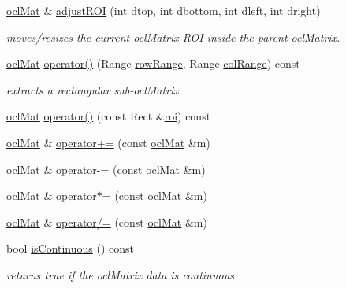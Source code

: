 \begin{DoxyCompactItemize}
\hyperlink{classcv_1_1ocl_1_1oclMat}{ocl\-Mat} \& \hyperlink{classcv_1_1ocl_1_1oclMat_a6303d07326fb07501d21153c2c5d6a2a}{adjust\-R\-O\-I} (int dtop, int dbottom, int dleft, int dright)
\begin{DoxyCompactList}\small\item\em moves/resizes the current ocl\-Matrix R\-O\-I inside the parent ocl\-Matrix. \end{DoxyCompactList}\item 
\hyperlink{classcv_1_1ocl_1_1oclMat}{ocl\-Mat} \hyperlink{classcv_1_1ocl_1_1oclMat_a6d603d156ac2e731adff478dd03a0d9b}{operator()} (Range \hyperlink{classcv_1_1ocl_1_1oclMat_a60bd94d8a6110a2e50bf9fbcfc2db0d2}{row\-Range}, Range \hyperlink{classcv_1_1ocl_1_1oclMat_a8d61c3d2a4c840c9f785ea1e319e1981}{col\-Range}) const 
\begin{DoxyCompactList}\small\item\em extracts a rectangular sub-\/ocl\-Matrix \end{DoxyCompactList}\item 
\hyperlink{classcv_1_1ocl_1_1oclMat}{ocl\-Mat} \hyperlink{classcv_1_1ocl_1_1oclMat_a5419a1174407d3df4804fe95440014e5}{operator()} (const Rect \&\hyperlink{legacy_8hpp_a22e52b2b51d064865d3ac2f27b308c33}{roi}) const 
\item 
\hyperlink{classcv_1_1ocl_1_1oclMat}{ocl\-Mat} \& \hyperlink{classcv_1_1ocl_1_1oclMat_a63fec80cebe9fec8d70b2a97943f9fac}{operator+=} (const \hyperlink{classcv_1_1ocl_1_1oclMat}{ocl\-Mat} \&m)
\item 
\hyperlink{classcv_1_1ocl_1_1oclMat}{ocl\-Mat} \& \hyperlink{classcv_1_1ocl_1_1oclMat_a97b34e86a17e11332cc0b332209e7ee5}{operator-\/=} (const \hyperlink{classcv_1_1ocl_1_1oclMat}{ocl\-Mat} \&m)
\item 
\hyperlink{classcv_1_1ocl_1_1oclMat}{ocl\-Mat} \& \hyperlink{classcv_1_1ocl_1_1oclMat_aefb8803c6926b83ebbb927f3cae698d4}{operator$\ast$=} (const \hyperlink{classcv_1_1ocl_1_1oclMat}{ocl\-Mat} \&m)
\item 
\hyperlink{classcv_1_1ocl_1_1oclMat}{ocl\-Mat} \& \hyperlink{classcv_1_1ocl_1_1oclMat_a55a00c571b0f1528ceb8ca22b81ec57b}{operator/=} (const \hyperlink{classcv_1_1ocl_1_1oclMat}{ocl\-Mat} \&m)
\item 
bool \hyperlink{classcv_1_1ocl_1_1oclMat_a7a932d59a666315afe295d259b6e61b6}{is\-Continuous} () const 
\begin{DoxyCompactList}\small\item\em returns true if the ocl\-Matrix data is continuous \end{DoxyCompactList}\item 

\end{DoxyCompactItemize}
